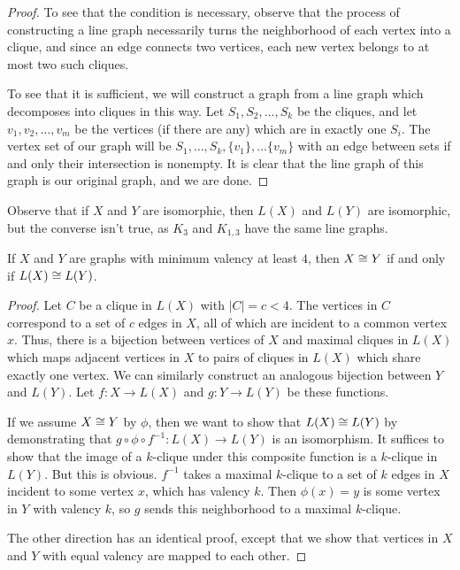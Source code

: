 
\begin{proof}
	
	To see that the condition is necessary, observe that the process of constructing a line graph necessarily turns the neighborhood of each vertex into a clique, and since an edge connects two vertices, each new vertex belongs to at most two such cliques.
	
	To see that it is sufficient, we will construct a graph from a line graph which decomposes into cliques in this way.  Let $S_1,S_2,\dots,S_k$ be the cliques, and let $v_1,v_2,\dots,v_m$ be the vertices (if there are any) which are in exactly one $S_i$.  The vertex set of our graph will be $S_1,\dots,S_k,\{v_1\},\dots \{v_m\}$ with an edge between sets if and only their intersection is nonempty.  It is clear that the line graph of this graph is our original graph, and we are done.
	
\end{proof}

Observe that if $X$ and $Y$ are isomorphic, then $L(X)$ and $L(Y)$ are isomorphic, but the converse isn't true, as $K_3$ and $K_{1,3}$ have the same line graphs.

\begin{lemma}
	
{If $X$ and $Y$ are graphs with minimum valency at least $4$, then $X\cong Y$ if and only if $L(X)\cong L(Y)$.}
\end{lemma}
\begin{proof}
	Let $C$ be a clique in $L(X)$ with $|C|=c<4$.  The vertices in $C$ correspond to a set of $c$ edges in $X$, all of which are incident to a common vertex $x$.  Thus, there is a bijection between vertices of $X$ and maximal cliques in $L(X)$ which maps adjacent vertices in $X$ to pairs of cliques in $L(X)$ which share exactly one vertex.  We can similarly construct an analogous bijection between $Y$ and $L(Y)$.  Let $f:X\rightarrow L(X)$ and $g:Y\rightarrow L(Y)$ be these functions.
	
	If we assume $X\cong Y$ by $\phi$, then we want to show that $L(X)\cong L(Y)$ by demonstrating that $g\circ\phi\circ f^{-1}:L(X)\rightarrow L(Y)$ is an isomorphism.  It suffices to show that the image of a $k$-clique under this composite function is a $k$-clique in $L(Y)$.  But this is obvious.  $f^{-1}$ takes a maximal $k$-clique to a set of $k$ edges in $X$ incident to some vertex $x$, which has valency $k$.  Then $\phi(x)=y$ is some vertex in $Y$ with valency $k$, so $g$ sends this neighborhood to a maximal $k$-clique.
	
	The other direction has an identical proof, except that we show that vertices in $X$ and $Y$ with equal valency are mapped to each other.
\end{proof}

